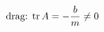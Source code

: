 \documentclass[preview]{standalone}
\begin{document}
\begin{align*}
\special{dvisvgm:raw <g id='unique000'>}\text{drag: } \mathrm{tr}\,A=-\frac bm\neq 0\special{dvisvgm:raw </g>}
\end{align*}
\end{document}
